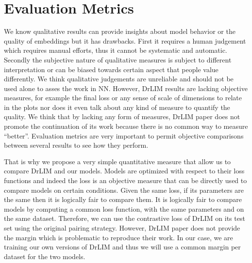 \documentclass[a4paper,12pt]{report}
\begin{document}
\section{Evaluation Metrics}
We know qualitative results can provide insights about model behavior or the quality of embeddings but it has drawbacks.
First it requires a human judgement which requires manual efforts, thus it cannot be systematic and automatic.
Secondly the subjective nature of qualitative measures is subject to different interpretation or can be biased towards certain aspect that people value differently.
We think qualitative judgements are unreliable and should not be used alone to asses the work in NN.
However, DrLIM results are lacking objective measures, for example the final loss or any sense of scale of dimensions to relate in the plots nor does it even talk about any kind of measure to quantify the quality.
We think that by lacking any form of measures, DrLIM paper does not promote the continuation of its work because there is no common way to measure ``better''.
Evaluation metrics are very important to permit objective comparisons between several results to see how they perform.

That is why we propose a very simple quantitative measure that allow us to compare DrLIM and our models.
Models are optimized with respect to their loss functions and indeed the loss is an objective measure that can be directly used to compare models on certain conditions.
Given the same loss, if its parameters are the same then it is logically fair to compare them.
It is logically fair to compare models by computing a common loss function, with the same parameters and on the same dataset.
Therefore, we can use the contrastive loss of DrLIM on its test set using the original pairing strategy.
However, DrLIM paper does not provide the margin which is problematic to reproduce their work.
In our case, we are training our own versions of DrLIM and thus we will use a common margin per dataset for the two models.



\end{document}
